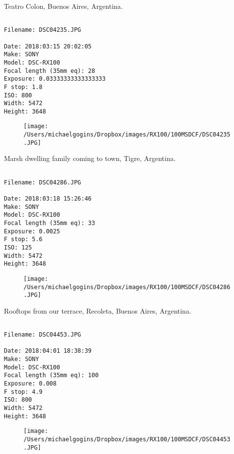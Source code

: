 \documentclass[11pt,letter,DIV=14,paper=landscape]{scrbook}
\begin{document}
\clearpage
\noindent Teatro Colon, Buenos Aires, Argentina.
\noindent
\begin{lstlisting}

Filename: DSC04235.JPG

Date: 2018:03:15 20:02:05
Make: SONY
Model: DSC-RX100
Focal length (35mm eq): 28
Exposure: 0.03333333333333333
F stop: 1.8
ISO: 800
Width: 5472
Height: 3648
\end{lstlisting}
\clearpage

\begin{figure}
\texttt{[image: /Users/michaelgogins/Dropbox/images/RX100/100MSDCF/DSC04235.JPG]}
\end{figure}
    
\clearpage
\noindent Marsh dwelling family coming to town, Tigre, Argentina.
\noindent
\begin{lstlisting}

Filename: DSC04286.JPG

Date: 2018:03:18 15:26:46
Make: SONY
Model: DSC-RX100
Focal length (35mm eq): 33
Exposure: 0.0025
F stop: 5.6
ISO: 125
Width: 5472
Height: 3648
\end{lstlisting}
\clearpage

\begin{figure}
\texttt{[image: /Users/michaelgogins/Dropbox/images/RX100/100MSDCF/DSC04286.JPG]}
\end{figure}
    
\clearpage
\noindent Rooftops from our terrace, Recoleta, Buenos Aires, Argentina.
\noindent
\begin{lstlisting}

Filename: DSC04453.JPG

Date: 2018:04:01 18:38:39
Make: SONY
Model: DSC-RX100
Focal length (35mm eq): 100
Exposure: 0.008
F stop: 4.9
ISO: 800
Width: 5472
Height: 3648
\end{lstlisting}
\clearpage

\begin{figure}
\texttt{[image: /Users/michaelgogins/Dropbox/images/RX100/100MSDCF/DSC04453.JPG]}
\end{figure}
    
\end{document}
